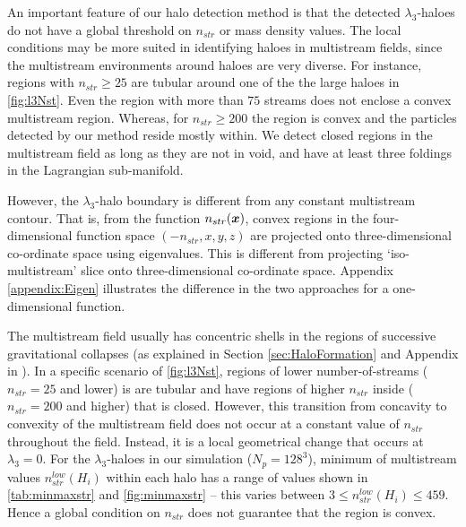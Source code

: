 \documentclass[fleqn,usenatbib,useAMS]{mnras}
\begin{document}
An important feature of our halo detection method is that the detected $\lambda_3$-haloes do not have a global threshold on $n_{str}$ or mass density values. The local conditions may be more suited in identifying haloes in multistream fields, since the multistream environments around haloes are very diverse. For instance, regions with $n_{str} \geq 25$ are tubular around one of the the large haloes in \autoref{fig:l3Nst}. Even the region with more than $75$ streams does not enclose a convex multistream region. Whereas, for $n_{str} \geq 200$ the region is convex and the particles detected by our method reside mostly within. We detect closed regions in the multistream field as long as they are not in void, and have at least three foldings in the Lagrangian sub-manifold.

However, the $\lambda_3$-halo boundary is different from any constant multistream contour. That is, from the function $n_{str}(\bmath{x})$, convex regions in the four-dimensional function space $(-n_{str}, x, y, z)$ are projected onto three-dimensional co-ordinate space using eigenvalues. This is different from projecting `iso-multistream' slice onto three-dimensional co-ordinate space. Appendix \ref{appendix:Eigen} illustrates the difference in the two approaches for a one-dimensional function. 


The multistream field usually has concentric shells in the regions of successive gravitational collapses (as explained in Section \ref{sec:HaloFormation} and Appendix in \citealt{Ramachandra2017}). In a specific scenario  of \autoref{fig:l3Nst}, regions of lower number-of-streams ($n_{str} = 25$ and lower) is are tubular and have regions of higher $n_{str}$ inside ($n_{str} = 200$ and higher) that is closed. However, this transition from concavity to convexity of the multistream field does not occur at a constant value of $n_{str}$ throughout the field. Instead, it is a local geometrical change that occurs at $\lambda_3 = 0$. For the $\lambda_3$-haloes in our simulation ($N_p = 128^3$), minimum of multistream values $n_{str}^{low}(H_i)$ within each halo has a range of values shown in \autoref{tab:minmaxstr} and \autoref{fig:minmaxstr} -- this varies between $ 3 \leq n_{str}^{low}(H_i) \leq 459$. Hence a global condition on $n_{str}$ does not guarantee that the region is convex. 
\end{document}
